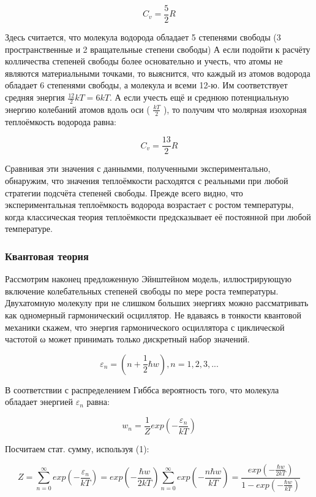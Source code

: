 \documentclass[a4paper, 12pt]{article}
\begin{document}
\[C_v = \frac{5}{2} R\]

Здесь считается, что молекула водорода обладает 5 степенями свободы (3 пространственные и 2 вращательные степени свободы)
А если подойти к расчёту колличества степеней свободы более основательно и учесть, что атомы не
являются материальными точками, то выяснится, что каждый из атомов водорода обладает 6 степенями свободы, а молекула и всеми 12-ю. Им соответствует средняя энергия $\frac{12}{2} kT = 6kT$. А если учесть
ещё и среднюю потенциальную энергию колебаний атомов вдоль оси ( $\frac{kT}{2}$
), то получим что молярная
изохорная теплоёмкость водорода равна:

\[C_v = \frac{13}{2} R\]

Сравнивая эти значения с даннымми, полученными экспериментально, обнаружим, что значения
теплоёмкости расходятся с реальными при любой стратегии подсчёта степеней свободы. Прежде всего
видно, что экспериментальная теплоёмкость водорода возрастает с ростом температуры, когда классическая теория теплоёмкости предсказывает её постоянной при любой температуре.

\subsubsection{Квантовая теория}
Рассмотрим наконец предложенную Эйнштейном модель, иллюстрирующую включение колебательных
степеней свободы по мере роста температуры.
Двухатомную молекулу при не слишком больших энергиях можно рассматривать как одномерный гармонический осциллятор. Не вдаваясь в тонкости квантовой механики скажем, что энергия гармонического осциллятора с циклической частотой ω может принимать только дискретный набор значений.

\begin{equation}
    \varepsilon_n = (n + \frac{1}{2} \hbar w), n = 1, 2, 3, ...    
\end{equation}

В соответствии с распределением Гиббса вероятность того, что молекула обладает энергией $\varepsilon_n$ равна:

\begin{equation}
    w_n = \frac{1}{Z} exp(- \frac{\varepsilon_n}{kT})
\end{equation}

Посчитаем стат. сумму, используя (1):

\begin{equation}
    Z = \sum_{n = 0}^{\infty}  exp(- \frac{\varepsilon_n}{kT}) = exp(- \frac{\hbar w}{2kT}) \sum_{n = 0}^{\infty}  exp(- \frac{n \hbar w}{kT}) = 
    \frac{ exp(- \frac{\hbar w}{2kT})}{1 -  exp(- \frac{\hbar w}{kT})}
\end{equation}
\end{document}
